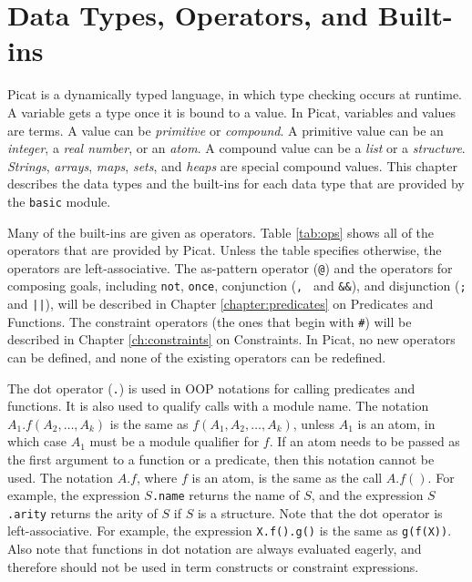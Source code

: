 \chapter{\label{chapter:datatypes}Data Types, Operators, and Built-ins}
Picat is a dynamically typed language, in which type checking occurs at runtime. A variable gets a type once it is bound to a value. In Picat, variables and values are terms. A value can be \emph{primitive} or \emph{compound}. A primitive value can be an \emph{integer}, a \emph{real number}, or an \emph{atom}. A compound value can be a \emph{list} or a \emph{structure}. \emph{Strings}, \emph{arrays}, \emph{maps}, \emph{sets}, and \emph{heaps} are special compound values. This chapter describes the data types and the built-ins for each data type that are provided by the \texttt{basic} module. 

Many of the built-ins are given as operators. Table \ref{tab:ops} shows all of the operators that are provided by Picat. Unless the table specifies otherwise, the operators are left-associative.  The as-pattern operator (\verb+@+) and the operators for composing goals, including \texttt{not}, \texttt{once}, conjunction (\verb+, + and \verb+&&+), and disjunction (\verb+;+ and \verb+||+), will be described in Chapter \ref{chapter:predicates} on Predicates and Functions.  The constraint operators (the ones that begin with \verb+#+) will be described in Chapter \ref{ch:constraints} on Constraints. In Picat, no new operators can be defined, and none of the existing operators can be redefined.

The dot operator (\verb+.+) is used in OOP notations for calling predicates and functions. It is also used to qualify calls with a module name. The notation \texttt{$A_1.f(A_2, \ldots, A_k)$} is the same as \texttt{$f(A_1, A_2, \ldots, A_k)$}, unless $A_1$ is an atom, in which case $A_1$ must be a module qualifier for $f$.  If an atom needs to be passed as the first argument to a function or a predicate, then this notation cannot be used. The notation $A.f$, where $f$ is an atom, is the same as the call \texttt{$A.f()$}. For example, the expression \texttt{$S$.name} returns the name of $S$, and the expression \texttt{$S$.arity} returns the arity of $S$ if $S$ is a structure.   Note that the dot operator is left-associative.  For example, the expression \texttt{X.f().g()} is the same as \texttt{g(f(X))}. Also note that functions in dot notation are always evaluated eagerly, and therefore should not be used in term constructs or constraint expressions.

